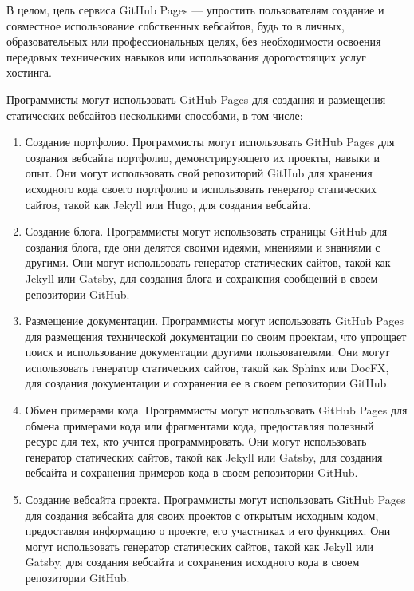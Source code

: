 \documentclass[letterpaper,10pt,russian]{sphinxmanual}
\begin{document}
\sphinxAtStartPar
В целом, цель сервиса GitHub Pages — упростить пользователям создание и совместное использование собственных веб\sphinxhyphen{}сайтов, будь то в личных, образовательных или профессиональных целях, без необходимости освоения передовых технических навыков или использования дорогостоящих услуг хостинга.

\sphinxAtStartPar
{}
Программисты могут использовать GitHub Pages для создания и размещения статических веб\sphinxhyphen{}сайтов несколькими способами, в том числе:
\begin{enumerate}
%
\item {} 
\sphinxAtStartPar
Создание портфолио. Программисты могут использовать GitHub Pages для создания веб\sphinxhyphen{}сайта портфолио, демонстрирующего их проекты, навыки и опыт. Они могут использовать свой репозиторий GitHub для хранения исходного кода своего портфолио и использовать генератор статических сайтов, такой как Jekyll или Hugo, для создания веб\sphinxhyphen{}сайта.

\item {} 
\sphinxAtStartPar
Создание блога. Программисты могут использовать страницы GitHub для создания блога, где они делятся своими идеями, мнениями и знаниями с другими. Они могут использовать генератор статических сайтов, такой как Jekyll или Gatsby, для создания блога и сохранения сообщений в своем репозитории GitHub.

\item {} 
\sphinxAtStartPar
Размещение документации. Программисты могут использовать GitHub Pages для размещения технической документации по своим проектам, что упрощает поиск и использование документации другими пользователями. Они могут использовать генератор статических сайтов, такой как Sphinx или DocFX, для создания документации и сохранения ее в своем репозитории GitHub.

\item {} 
\sphinxAtStartPar
Обмен примерами кода. Программисты могут использовать GitHub Pages для обмена примерами кода или фрагментами кода, предоставляя полезный ресурс для тех, кто учится программировать. Они могут использовать генератор статических сайтов, такой как Jekyll или Gatsby, для создания веб\sphinxhyphen{}сайта и сохранения примеров кода в своем репозитории GitHub.

\item {} 
\sphinxAtStartPar
Создание веб\sphinxhyphen{}сайта проекта. Программисты могут использовать GitHub Pages для создания веб\sphinxhyphen{}сайта для своих проектов с открытым исходным кодом, предоставляя информацию о проекте, его участниках и его функциях. Они могут использовать генератор статических сайтов, такой как Jekyll или Gatsby, для создания веб\sphinxhyphen{}сайта и сохранения исходного кода в своем репозитории GitHub.


\end{enumerate}
\end{document}
